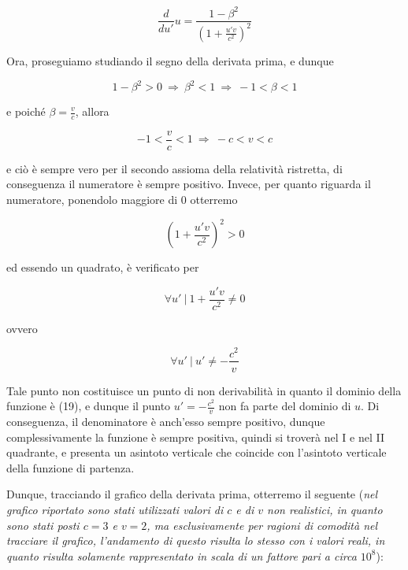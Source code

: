 \documentclass{article}
\begin{document}
\begin{equation}
    \frac{d}{du'} u = \frac{1 - \beta^2}{\left(1 + \frac{u'v}{c^2}\right)^2}
\end{equation}

Ora, proseguiamo studiando il segno della derivata prima, e dunque

\begin{equation}
    1 - \beta^2 > 0\ \Rightarrow\ \beta^2 < 1\ \Rightarrow\ -1 < \beta < 1
\end{equation}

e poiché \(\beta = \frac{v}{c}\), allora

\begin{equation}
    -1 < \frac{v}{c} < 1\ \Rightarrow\ -c < v < c
\end{equation}

e ciò è sempre vero per il secondo assioma della relatività
ristretta, di conseguenza il numeratore è sempre positivo. Invece,
per quanto riguarda il numeratore, ponendolo maggiore di
0 otterremo

\begin{equation}
    (1 + \frac{u'v}{c^2})^2 > 0
\end{equation}

ed essendo un quadrato, è verificato per

\begin{equation}
    \forall u'\ |\ 1 + \frac{u'v}{c^2} \neq 0
\end{equation}

ovvero

\begin{equation}
    \forall u'\ |\ u' \neq - \frac{c^2}{v}
\end{equation}

Tale punto non costituisce un punto di non derivabilità
in quanto il dominio della funzione è (19), e dunque
il punto \(u' = - \frac{c^2}{v}\) non fa parte del
dominio di \(u\). Di conseguenza, il denominatore è
anch'esso sempre positivo, dunque complessivamente
la funzione è sempre positiva, quindi si troverà nel
I e nel II quadrante, e presenta un asintoto verticale
che coincide con l'asintoto verticale della funzione
di partenza.\hfill\break

Dunque, tracciando il grafico della derivata prima,
otterremo il seguente (\textit{nel grafico riportato
sono stati utilizzati valori di \(c\) e di \(v\)
non realistici, in quanto sono stati posti \(c = 3\) e \(v = 2\),
ma esclusivamente per ragioni di comodità nel tracciare
il grafico, l'andamento di questo risulta lo stesso con i
valori reali, in quanto risulta solamente rappresentato
in scala di un fattore pari a circa \(10^8\)}):
\end{document}
